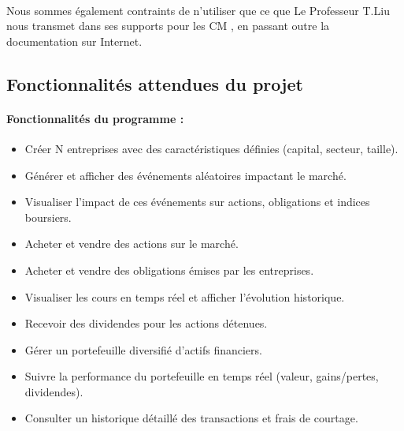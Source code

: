\paragraph{} Nous sommes également contraints de n'utiliser que ce que Le Professeur T.Liu nous transmet dans ses supports pour les CM \cite{data}, en passant outre la documentation sur Internet.


\subsection{Fonctionnalités attendues du projet}
\label{sec:spec2}

\paragraph{Fonctionnalités du programme :} 

\begin{itemize}
    \item Créer N entreprises avec des caractéristiques définies (capital, secteur, taille).
    \item Générer et afficher des événements aléatoires impactant le marché.
    \item Visualiser l'impact de ces événements sur actions, obligations et indices boursiers.
    \item Acheter et vendre des actions sur le marché.
    \item Acheter et vendre des obligations émises par les entreprises.
    \item Visualiser les cours en temps réel et afficher l'évolution historique.
    \item Recevoir des dividendes pour les actions détenues.
    \item Gérer un portefeuille diversifié d’actifs financiers.
    \item Suivre la performance du portefeuille en temps réel (valeur, gains/pertes, dividendes).
    \item Consulter un historique détaillé des transactions et frais de courtage.
\end{itemize}



